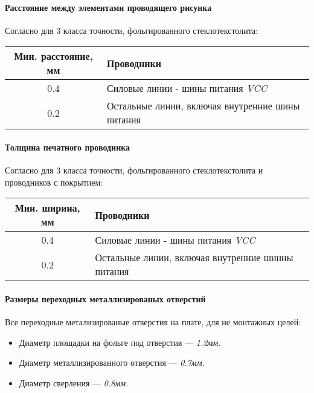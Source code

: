 \paragraph{Расстояние между элементами проводящего рисунка}
Согласно \cite[Табл. 7]{GOST_23751_86} для 3 класса точности,
фольгированного стеклотекстолита:

\begin{tabular}{|c|l|}
    \hline
    Мин. расстояние, мм & Проводники \\
    \hline
    0.4 & Силовые линии - шины питания \textit{VCC} \\
    \hline
    0.2 & Остальные линии, включая внутренние шины питания \\
    \hline
\end{tabular}

\paragraph{Толщина печатного проводника}
Согласно \cite[Табл. 9]{GOST_23751_86} для 3 класса точности,
фольгированного стеклотекстолита и проводников с покрытием:

\begin{tabular}{|c|l|}
    \hline
    Мин. ширина, мм & Проводники \\
    \hline
    0.4 & Силовые линии - шины питания \textit{VCC} \\
    \hline
    0.2 & Остальные линии, включая внутренние шиниы питания \\
    \hline
\end{tabular}

\paragraph{Размеры переходных металлизированых отверстий}
Все переходные метализированые отверстия на плате, для не монтажных целей:

\begin{itemize}
    \item Диаметр площадки на фольге под отверстия --- \textit{1.2мм.}
    \item Диаметр металлизированного отверстия --- \textit{0.7мм.}
    \item Диаметр сверления --- \textit{0.8мм.}
\end{itemize}
